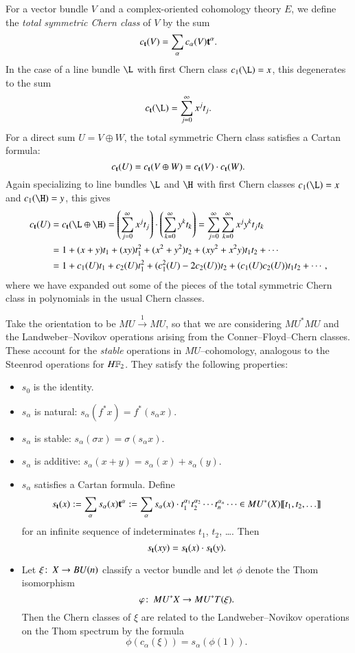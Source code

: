 \begin{remark}
For a vector bundle $V$ and a complex-oriented cohomology theory $E$, we define the \textit{total symmetric Chern class} of $V$ by the sum \[c_{\mathbf t}(V) = \sum_\alpha c_\alpha(V) \mathbf t^{\alpha}.\]  In the case of a line bundle $\L$ with first Chern class $c_1(\L) = x$, this degenerates to the sum \[c_{\t}(\L) = \sum_{j=0}^\infty x^j t_j.\]  For a direct sum $U = V \oplus W$, the total symmetric Chern class satisfies a Cartan formula: \[c_{\mathbf t}(U) = c_{\mathbf t}(V \oplus W) = c_{\mathbf t}(V) \cdot c_{\mathbf t}(W).\]  Again specializing to line bundles $\L$ and $\H$ with first Chern classes $c_1(\L) = x$ and $c_1(\H) = y$, this gives
\begin{align*}
c_{\t}(U) & = c_{\t}(\L \oplus \H) = \left( \sum_{j=0}^\infty x^j t_j \right) \cdot \left( \sum_{k=0}^\infty y^k t_k \right) = \sum_{j = 0}^{\infty} \sum_{k=0}^\infty x^j y^k t_j t_k \\
& = 1 + (x + y)t_1 + (xy)t_1^2 + (x^2 + y^2)t_2 + (xy^2 + x^2y)t_1 t_2 + \cdots \\
& = 1 + c_1(U)t_1 + c_2(U)t_1^2 + (c_1^2(U) - 2c_2(U))t_2 + (c_1(U) c_2(U))t_1t_2 + \cdots,
\end{align*}
where we have expanded out some of the pieces of the total symmetric Chern class in polynomials in the usual Chern classes.
\end{remark}

\begin{definition}
Take the orientation to be $MU \xrightarrow{1} MU$, so that we are considering $MU^* MU$ and the Landweber--Novikov operations arising from the Conner--Floyd--Chern classes.  These account for the \emph{stable} operations in $MU$--cohomology, analogous to the Steenrod operations for $\HFtwo$.  They satisfy the following properties:
\begin{itemize}
\item $s_0$ is the identity.
\item $s_\alpha$ is natural: $s_\alpha(f^* x) = f^*(s_\alpha x)$.
\item $s_\alpha$ is stable: $s_\alpha(\sigma x) = \sigma(s_\alpha x)$.
\item $s_\alpha$ is additive: $s_\alpha(x + y) = s_\alpha(x) + s_\alpha(y)$.
\item $s_\alpha$ satisfies a Cartan formula.  Define \[s_{\mathbf t}(x) := \sum_{\alpha} s_\alpha(x) \mathbf t^\alpha := \sum_\alpha s_\alpha(x) \cdot t_1^{\alpha_1} t_2^{\alpha_2} \cdots t_n^{\alpha_n} \cdots \in MU^*(X)\llbracket{t_1, t_2, \ldots}\rrbracket\] for an infinite sequence of indeterminates $t_1$, $t_2$, \ldots.  Then \[s_{\mathbf t}(x y) = s_{\mathbf t}(x) \cdot s_{\mathbf t}(y).\]
\item Let $\xi\colon\thinspace X \to BU(n)$ classify a vector bundle and let $\phi$ denote the Thom isomorphism \[\varphi\colon\thinspace MU^* X \to MU^* T(\xi).\]  Then the Chern classes of $\xi$ are related to the Landweber--Novikov operations on the Thom spectrum by the formula \[\phi(c_\alpha(\xi)) = s_\alpha(\phi(1)).\]
\end{itemize}
\end{definition}

